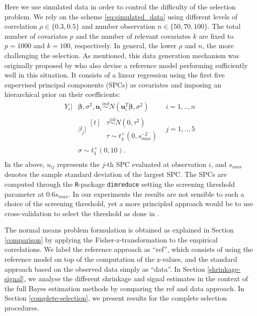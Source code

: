 \documentclass[american,]{article}
\theoremstyle{definition}
\begin{document}
Here we use simulated data in order to control the difficulty of the
selection problem. We rely on the scheme \eqref{eq:simulated_data}
using different levels of correlation $\rho\in\{0.3,0.5\}$ and number
observation $n\in\{50,70,100\}$. The total number of covariates $p$
and the number of relevant covariates $k$ are fixed to $p = 1000$ and
$k = 100$, respectively. In general, the lower $\rho$ and $n$, the
more challenging the selection. As mentioned, this data generation
mechanism was originally proposed by \cite{paper:projpred} who also
devise a reference model performing sufficiently well in this
situation. It consists of a linear regression using the first five
supervised principal components (SPCs) \citep{bair2006prediction,
  piironen2018} as covariates and imposing an hierarchical prior on
their coefficients: \
\begin{equation}
\label{eq:ref_mod}
\begin{aligned}
    Y_{i}|&\boldsymbol{\beta},\sigma^{2},\boldsymbol{u}_{i} \overset{ind}{\sim} N(\boldsymbol{u}_{i}^{T}\boldsymbol{\beta},\sigma^{2}) \quad &i=1,..,n \\
    &\beta_{j}|\!\begin{aligned}[t] &\tau \overset{iid}{\sim} N(0,\tau^{2})\\
    &\tau \sim t_{4}^{+}(0,s_{max}^{-2}) 
    \end{aligned} &j=1,..,5 \\ 
    &\sigma \sim t_{3}^{+}(0,10). \\
\end{aligned}
\end{equation}
In the above, $u_{ij}$ represents the $j$-th SPC evaluated at
observation $i$, and $s_{max}$ denotes the sample standard deviation
of the largest SPC.  The SPCs are computed through the
\texttt{R}-package \texttt{dimreduce} setting the screening threshold
parameter at $0.6s_{max}$.  In our experiments the results are not
sensible to such a choice of the screening threshold, yet a more
principled approach would be to use cross-validation to select the
threshold as done in \cite{paper:projpred}.

The normal means problem formulation is obtained as explained in
Section \ref{comparison} by applying the Fisher-z-transformation to
the empirical correlations. We label the reference approach as
``ref'', which consists of using the reference model on top of the
computation of the z-values, and the standard approach based on the
observed data simply as ``data''. In Section \ref{shrinkage-signal},
we analyse the different shrinkage and signal estimates in the context
of the full Bayes estimation methods by comparing the ref and data
approach. In Section \ref{complete-selection}, we present results for
the complete selection procedures.
\end{document}
